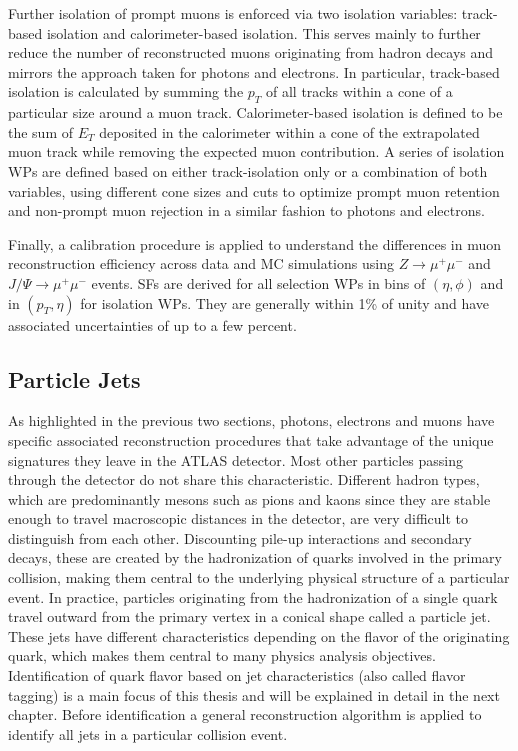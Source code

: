 Further isolation of prompt muons is enforced via two isolation variables: track-based isolation and calorimeter-based isolation. 
This serves mainly to further reduce the number of reconstructed muons originating from hadron decays and mirrors the approach 
taken for photons and electrons. In particular, track-based isolation is calculated by summing the $p_T$ of all tracks within a 
cone of a particular size around a muon track. Calorimeter-based isolation is defined to be the sum of $E_T$ deposited in the 
calorimeter within a cone of the extrapolated muon track while removing the expected muon contribution. A series of isolation WPs 
are defined based on either track-isolation only or a combination of both variables, using different cone sizes and cuts to 
optimize prompt muon retention and non-prompt muon rejection in a similar fashion to photons and electrons. \par

Finally, a calibration procedure is applied to understand the differences in muon reconstruction efficiency across data and MC 
simulations using $Z \rightarrow \mu^+\mu^-$ and $J/\Psi \rightarrow \mu^+\mu^-$ events. SFs are derived for all selection WPs 
in bins of $(\eta, \phi)$ and in $(p_T, \eta)$ for isolation WPs. They are generally within 1\% of unity and have associated 
uncertainties of up to a few percent. \par

\subsection{Particle Jets}

As highlighted in the previous two sections, photons, electrons and muons have specific associated reconstruction procedures 
that take advantage of the unique signatures they leave in the ATLAS detector. Most other particles passing through the 
detector do not share this characteristic. Different hadron types, which are predominantly mesons such as pions and 
kaons since they are stable enough to travel macroscopic distances in the detector, are very difficult to distinguish from 
each other. Discounting pile-up interactions and secondary decays, these are created by the hadronization of quarks 
involved in the primary collision, making them central to the underlying physical structure of a particular event. In 
practice, particles originating from the hadronization of a single quark travel outward from the primary vertex in a conical 
shape called a particle jet. These jets have different characteristics depending on the flavor of the originating quark, 
which makes them central to many physics analysis objectives. Identification of quark flavor based on jet characteristics 
(also called flavor tagging) is a main focus of this thesis and will be explained in detail in the next chapter. Before 
identification a general reconstruction algorithm is applied to identify all jets in a particular collision event.

